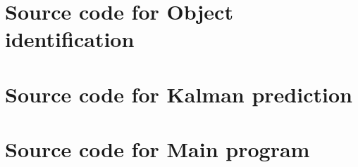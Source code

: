 \documentclass[10pt, a4paper, twoside]{article}
\numberwithin{equation}{section}
\numberwithin{figure}{section}
\begin{document}
\newpage
\section{Source code for Object identification}
\label{sec:ObjID_code}

\newpage


\newpage
\section{Source code for Kalman prediction}
\label{sec:Kalman_code}

\newpage


\newpage
\section{Source code for Main program}
\label{sec:Main_code}



%
\end{document}
